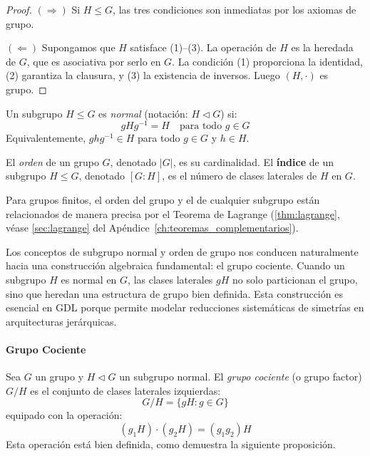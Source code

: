 \begin{proof}
$(\Rightarrow)$ Si $H \leq G$, las tres condiciones son inmediatas por los axiomas de grupo.

$(\Leftarrow)$ Supongamos que $H$ satisface (1)--(3). La operación de $H$ es la heredada de $G$, que es asociativa por serlo en $G$. La condición (1) proporciona la identidad, (2) garantiza la clausura, y (3) la existencia de inversos. Luego $(H, \cdot)$ es grupo.
\end{proof}

\begin{definition}\label{def:subgrupo_normal}
Un subgrupo $H \leq G$ es \textit{normal} (notación: $H \triangleleft G$) si:
\begin{equation}
gHg^{-1} = H \quad \text{para todo } g \in G
\end{equation}
Equivalentemente, $ghg^{-1} \in H$ para todo $g \in G$ y $h \in H$.
\end{definition}

\begin{definition}\label{def:orden_grupo}
El \textit{orden} de un grupo $G$, denotado $|G|$, es su cardinalidad. El \textbf{índice} de un subgrupo $H \leq G$, denotado $[G:H]$, es el número de clases laterales de $H$ en $G$.
\end{definition}

Para grupos finitos, el orden del grupo y el de cualquier subgrupo están relacionados de manera precisa por el Teorema de Lagrange (\autoref{thm:lagrange}, véase \autoref{sec:lagrange} del Apéndice~\ref{ch:teoremas_complementarios}).

Los conceptos de subgrupo normal y orden de grupo nos conducen naturalmente hacia una construcción algebraica fundamental: el grupo cociente. Cuando un subgrupo $H$ es normal en $G$, las clases laterales $gH$ no solo particionan el grupo, sino que heredan una estructura de grupo bien definida. Esta construcción es esencial en \gls{GDL} porque permite modelar reducciones sistemáticas de simetrías en arquitecturas jerárquicas.

\paragraph{Grupo Cociente}

\begin{definition}\label{def:grupo_cociente}
Sea $G$ un grupo y $H \triangleleft G$ un subgrupo normal. El \textit{grupo cociente} (o grupo factor) $G/H$ es el conjunto de clases laterales izquierdas:
\begin{equation}
G/H = \{gH : g \in G\}
\end{equation}
equipado con la operación:
\begin{equation}
(g_1H) \cdot (g_2H) = (g_1g_2)H
\end{equation}
Esta operación está bien definida, como demuestra la siguiente proposición.
\end{definition}

